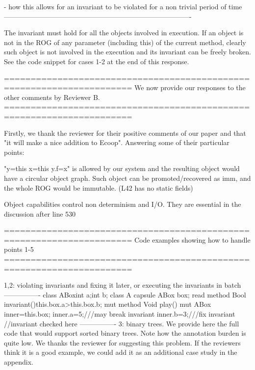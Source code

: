- how this allows for an invariant to be violated for a non trivial period of time
----------------------------------------------------------------------------------

The invariant must hold for all the objects involved in execution.
If an object is not in the ROG of any parameter (including this) of the current method,
clearly such object is not involved in the execution and its invariant can be freely broken.
See the code snippet for cases 1-2 at the end of this response.


======================================================================
We now provide our responses to the other comments by Reviewer B.
======================================================================

Firstly, we thank the reviewer for their positive comments of our paper and that "it will make a nice addition to Ecoop".
Answering some of their particular points: 

"y=this x=this y.f=x" is allowed by our system and the resulting object would have a circular object graph.
Such object can be promoted/recovered as imm, and the whole ROG would be immutable.
(L42 has no static fields)

Object capabilities control non determinism and I/O. They are essential in the discussion after line 530


======================================================================
Code examples showing how to handle points 1-5
======================================================================

1,2: violating invariants and fixing it later, or executing the invariants in batch
----------------
  class ABox{int a;int b;}
  class A{
   capsule ABox box;
   read method Bool invariant(){this.box.a>this.box.b;}
   mut method Void play(){
     mut ABox inner=this.box;
     inner.a=5;///may break invariant
     inner.b=3;///fix invariant
     //invariant checked here
     }}
----------------   
3: binary trees. We provide here the full code that would support sorted binary trees.
Note how the annotation burden is quite low. We thanks the reviewer for suggesting this problem.
If the reviewers think it is a good example, we could add it as an additional case study in the appendix.

